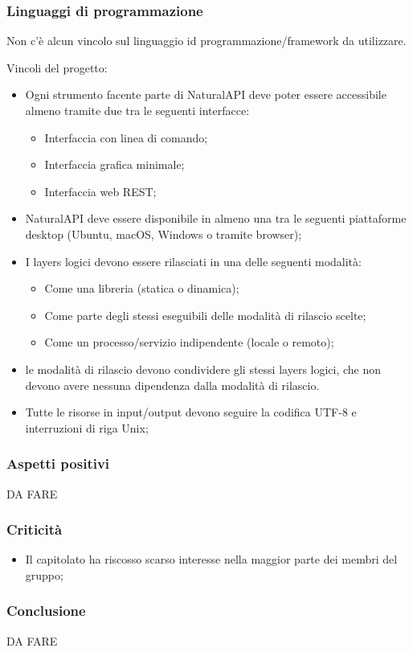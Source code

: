         \subsubsection{Linguaggi di programmazione}
        Non c'è alcun vincolo sul linguaggio id programmazione/framework da utilizzare.
        
Vincoli del progetto:
   	\begin{itemize}
   		\item Ogni strumento facente parte di NaturalAPI deve poter essere accessibile almeno tramite due tra le seguenti interfacce:
   			\begin{itemize}
   				\item Interfaccia con linea di comando;
   				\item Interfaccia grafica minimale;
   				\item Interfaccia web REST;
   			\end{itemize}
   			\item NaturalAPI deve essere disponibile in almeno una tra le seguenti piattaforme desktop (Ubuntu, macOS, Windows o tramite browser);
   			\item I layers logici devono essere rilasciati in una delle seguenti modalità:
   				\begin{itemize}
   					\item Come una libreria (statica o dinamica);
   					\item Come parte degli stessi eseguibili delle modalità di rilascio scelte;
   					\item Come un processo/servizio indipendente (locale o remoto);
   				\end{itemize}
   			\item le modalità di rilascio devono condividere gli stessi layers logici, che non devono avere nessuna dipendenza dalla modalità di rilascio.
   			\item Tutte le risorse in input/output devono seguire la codifica UTF-8 e interruzioni di riga Unix;
   	\end{itemize} 
    
    \subsubsection{Aspetti positivi}
    DA FARE
    \subsubsection{Criticità}
    \begin{itemize}
    		\item Il capitolato ha riscosso scarso interesse nella maggior parte dei membri del gruppo;
    		
    \end{itemize}
    \subsubsection{Conclusione}
    DA FARE